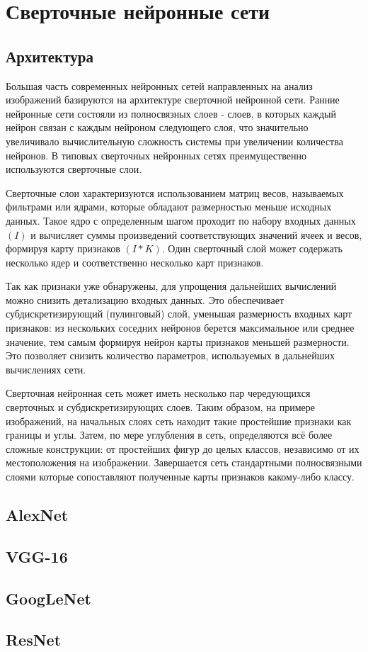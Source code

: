 \section{Сверточные нейронные сети}

\subsection{Архитектура}

Большая часть современных нейронных сетей направленных на анализ изображений базируются на архитектуре сверточной нейронной сети.
Ранние нейронные сети состояли из полносвязных слоев - слоев, в которых каждый нейрон связан с каждым нейроном следующего слоя, что значительно увеличивало вычислительную сложность системы при увеличении количества нейронов. 
В типовых сверточных нейронных сетях преимущественно используются сверточные слои. 

Сверточные слои характеризуются использованием матриц весов, называемых фильтрами или ядрами, которые обладают размерностью меньше исходных данных. Такое ядро с определенным шагом проходит по набору входных данных $(I)$ и вычисляет суммы произведений соответствующих значений ячеек и весов, формируя карту признаков $(I * K)$. Один сверточный слой может содержать несколько ядер и соответственно несколько карт признаков.



Так как признаки уже обнаружены, для упрощения дальнейших вычислений можно снизить детализацию входных данных. Это обеспечивает субдискретизирующий (пулинговый) слой, уменьшая размерность входных карт признаков: из нескольких соседних нейронов берется максимальное или среднее значение, тем самым формируя нейрон карты признаков меньшей размерности. Это позволяет снизить количество параметров, используемых в дальнейших вычислениях сети. 



Сверточная нейронная сеть может иметь несколько пар чередующихся сверточных и субдискретизирующих слоев. 
Таким образом, на примере изображений, на начальных слоях сеть находит такие простейшие признаки как границы и углы. Затем, по мере углубления в сеть, определяются всё более сложные конструкции: от простейших фигур до целых классов, независимо от их местоположения на изображении. Завершается сеть стандартными полносвязными слоями которые сопоставляют полученные карты признаков какому-либо классу.  


\subsection{AlexNet}

\subsection{VGG-16}

\subsection{GoogLeNet}

\subsection{ResNet}

\clearpage